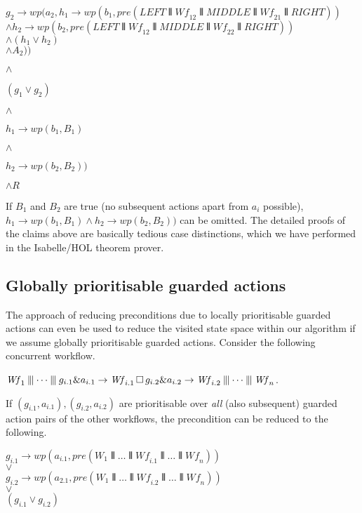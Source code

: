\documentclass[11pt]{article}
\newcommand{\Wf}{\mathit{Wf}}
\begin{document}
\noindent
$g_2 \longrightarrow wp(a_2,h_1 \longrightarrow wp(b_1,pre(LEFT \interleave \Wf_{12} \interleave MIDDLE \interleave \Wf_{21} \interleave RIGHT))$ \\
\hspace*{60pt}       $\land h_2 \longrightarrow wp(b_2,pre(LEFT \interleave \Wf_{12} \interleave MIDDLE \interleave \Wf_{22} \interleave RIGHT))$ \\ 
\hspace*{60pt}       $\land (h_1 \lor h_2)$ \\
\hspace*{60pt}       $\land A_2))$

\noindent
$\land$

\noindent
$(g_1 \lor g_2)$

\noindent
$\land$

\noindent
$h_1 \longrightarrow wp(b_1, B_1)$ 

\noindent
$\land$

\noindent
$h_2 \longrightarrow wp(b_2, B_2))$

\noindent
$\land R$


If $B_1$ and $B_2$ are true (no subsequent actions apart from $a_i$ possible), $h_1 \longrightarrow wp(b_1, B_1) \land h_2 \longrightarrow wp(b_2, B_2))$ can be omitted. The detailed proofs of the claims above are basically tedious case distinctions, which we have performed in the Isabelle/HOL theorem prover.

\subsection{Globally prioritisable guarded actions}
\label{sec:prioritisation}

The approach of reducing preconditions due to locally prioritisable guarded actions can even be used to reduce the visited state space within our algorithm if we assume globally prioritisable guarded actions. Consider the following concurrent workflow.

\noindent
$\Wf_1 \interleave \dots \interleave g_{i.1} \& a_{i.1} \Prefix \Wf_{i.1} \Extchoice g_{i.2} \& a_{i.2} \Prefix \Wf_{i.2} \interleave \dots \interleave \Wf_n$. 

\noindent
If $(g_{i.1} , a_{i.1}), (g_{i.2} , a_{i.2})$ are prioritisable over \textit{all} (also subsequent) guarded action pairs of the other workflows, the precondition can be reduced to the following. 

\noindent
$g_{i.1} \longrightarrow wp(a_{i.1}, pre(W_1 \interleave \dots \interleave \Wf_{i.1} \interleave \dots \interleave \Wf_n))$ \\
$\lor$ \\
$g_{i.2} \longrightarrow wp(a_{2.1}, pre(W_1 \interleave \dots \interleave \Wf_{i.2} \interleave \dots \interleave \Wf_n))$ \\
$\lor$ \\
$(g_{i.1} \lor g_{i.2})$
\end{document}
